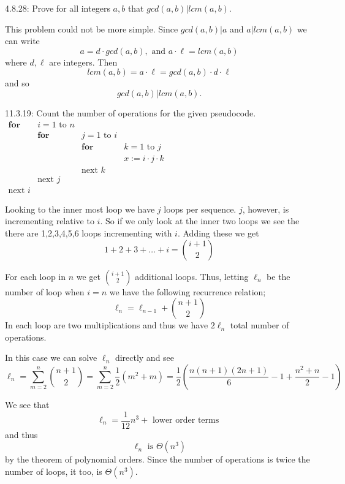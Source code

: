 \documentclass[16 pt]{amsart}
\theoremstyle{definition}
\theoremstyle{remark}
\numberwithin{equation}{subsection}
\begin{document}
\newpage


4.8.28: Prove for all integers $a,b$ that $gcd(a,b)|lcm(a,b)$.

This problem could not be more simple.  Since $gcd(a,b)|a$ and $a|lcm(a,b)$ we can write
\[
a = d\cdot gcd(a,b), \text{ and } a\cdot \ell = lcm(a,b)
\]
where $d,\ell$ are integers.  Then
\[
lcm(a,b) = a\cdot \ell = gcd(a,b)\cdot d\cdot \ell
\]
and so
\[
gcd(a,b) | lcm(a,b).
\]

\newpage


11.3.19: Count the number of operations for the given pseudocode.\\

$\begin{array}{llll}
\textbf{for} & i = 1 \text{ to } n& &\\
             & \textbf{for} & j=1 \text{ to } i & \\
             &    & \textbf{for} & k=1 \text{ to } j\\
             &    &       & x:= i\cdot j \cdot k\\  
             &   & \text{next } k & \\
             & \text{next } j & & \\
 \text{next } i & & & 
 \end{array}$      
 
 
 Looking to the inner most loop we have $j$ loops per sequence.  $j$, however, is incrementing relative to $i$.
 So if we only look at the inner two loops we see the there are 1,2,3,4,5,6 loops incrementing with $i$.
 Adding these we get
 \[
 1+2+3+\dots + i = \binom{i+1}{2}
 \]
 
 For each loop in $n$ we get $\binom{i+1}{2}$ additional loops.
 Thus, letting $\ell_n$ be the number of loop when $i=n$ we have the following recurrence relation;
 \[
 \ell_n = \ell_{n-1} + \binom{n+1}{2}
 \]
 In each loop are two multiplications and thus we have $2\ell_n$ total number of operations.
 
 In this case we can solve $\ell_n$ directly and see
 \[
 \ell_n = \sum_{m=2}^{n} \binom{n+1}{2} = \sum_{m=2}^{n} \frac{1}{2}(m^2+m) =\frac{1}{2}\left( \frac{n(n+1)(2n+1)}{6}-1 + \frac{n^2+n}{2}-1\right)
 \]
 
 We see that
 \[
 \ell_n = \frac{1}{12}n^3 + \text{ lower order terms } 
 \]
 and thus
 \[
 \ell_n \text{ is } \Theta(n^3)
 \]
 by the theorem of polynomial orders.  Since the number of operations is twice the number of loops, it too, is $\Theta(n^3)$.
      
\end{document}
